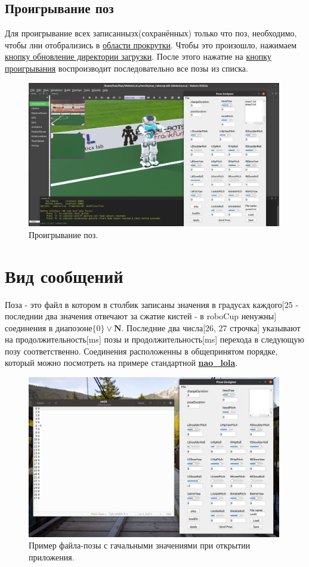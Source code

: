 \documentclass[12pt,a4paper]{article}
\begin{document}
\subsection{Проигрывание поз}
Для проигрывание всех записаннызх(сохранённых) только что поз, необходимо, чтобы лни отобрализись в \hyperref[scroll]{области прокрутки}. Чтобы это произошло, нажимаем \hyperref[loadDir]{кнопку обновление директории загрузки}. После этого нажатие на \hyperref[play]{кнопку проигрывания} воспроизводит последовательно все позы из списка.
\begin{figure}[h!]
    \centering
    \includegraphics[width = 0.99\textwidth]{./images/playClick.png}
    \caption{Проигрывание поз.}
    \label{fig:my_label}
\end{figure}
\newpage
\section{Вид сообщений}
\label{messageView}
Поза - это файл в котором в столбик записаны значения в градусах каждого[25 - последнии два значения отвечают за сжатие кистей - в roboCup ненужны] соединения в диапозоне$\{ 0 \} \vee \mathbf{N}$. Последние два числа[26, 27 строчка] указывают на продолжительность[ms] позы и продолжительность[ms] перехода в следующую позу соответственно. Соединения расположенны в общепринятом порядке, который можно посмотреть на примере стандартной  \href{https://github.com/ros-sports/nao_lola.git}{\textbf{nao\_lola}}.
\begin{figure}[h!]
    \centering
    \includegraphics[width=0.99\textwidth]{images/message.png}
    \caption{Пример файла-позы с гачальными значениями при открытии приложения.}
    \label{fig:messageView}
\end{figure}
\end{document}
